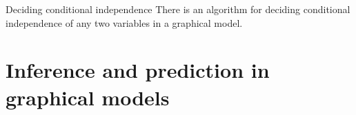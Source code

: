 



\begin{frame}
  \begin{alertblock}{Deciding conditional independence}
    There is an algorithm for deciding conditional independence of any two variables in a graphical model.
  \end{alertblock}

\end{frame}

\section{Inference and prediction in graphical models}
